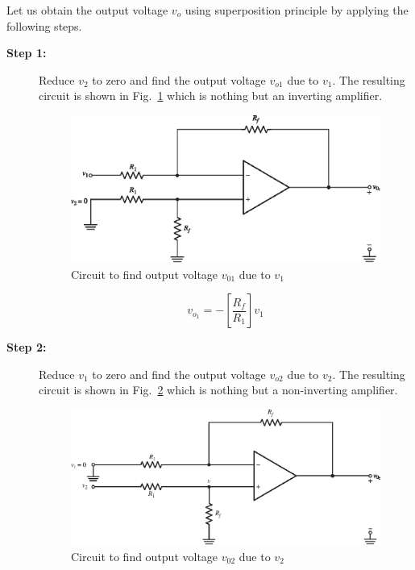 Let us obtain the output voltage $v_{o}$ using superposition principle by applying the following steps.

\eject

\begin{description}
\item[{\bf Step 1:}] Reduce $v_{2}$ to zero and find the output voltage $v_{o1}$ due to $v_{1}$. The resulting circuit is shown in Fig.~\ref{fig5.17} which is nothing but an inverting amplifier.
\begin{figure}[H]
\centering
\includegraphics{chap4/S3-EE-06-025.eps}
\caption{Circuit to find output voltage $v_{01}$ due to $v_{1}$}\label{fig5.17}
\end{figure}
\begin{equation}
v_{o_{1}}=-\left[\frac{R_{f}}{R_{1}}\right]v_{1}\label{eq5.48}
\end{equation}

\item[{\bf Step 2:}] Reduce $v_{1}$ to zero and find the output voltage $v_{o2}$ due to $v_{2}$. The resulting circuit is shown in Fig.~\ref{fig5.18} which is nothing but a non-inverting amplifier.
\begin{figure}[H]
\centering
\includegraphics{chap4/S3-EE-06-026.eps}
\caption{Circuit to find output voltage $v_{02}$ due to $v_{2}$}\label{fig5.18}
\end{figure}


\end{description}
